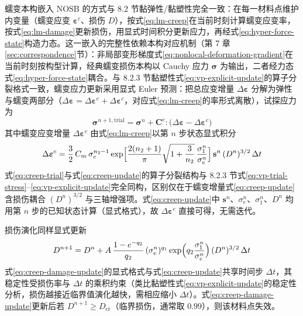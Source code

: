 蠕变本构嵌入 NOSB 的方式与 8.2 节黏弹性/黏塑性完全一致：在每一材料点维护内变量（蠕变应变 $\boldsymbol{\varepsilon}^{c}$、损伤 $D$），按式\eqref{eq:lm-creep}在当前时刻计算蠕变应变率，按式\eqref{eq:lm-damage}更新损伤，用显式时间积分更新应力，再经式\eqref{eq:hyper-force-state}构造力态。这一嵌入的完整性依赖本构对应机制（第 7 章\ref{sec:correspondence}节）：非局部变形梯度式\eqref{eq:nonlocal-deformation-gradient}在当前时刻按构型计算，经典蠕变损伤本构以 Cauchy 应力 $\boldsymbol{\sigma}$ 为输出，二者经力态式\eqref{eq:hyper-force-state}耦合。与 8.2.3 节黏塑性式\eqref{eq:vp-explicit-update}的算子分裂格式一致，蠕变应力更新采用显式 Euler 预测：把总应变增量 $\Delta\boldsymbol{\varepsilon}$ 分解为弹性与蠕变两部分（$\Delta\boldsymbol{\varepsilon}=\Delta\boldsymbol{\varepsilon}^{e}+\Delta\boldsymbol{\varepsilon}^{c}$，对应式\eqref{eq:lm-creep}的率形式离散），试探应力为
\begin{equation}
  \boldsymbol{\sigma}^{n+1,\mathrm{trial}}
  =\boldsymbol{\sigma}^{n}+\mathbf{C}^{e}:\bigl(\Delta\boldsymbol{\varepsilon}-\Delta\boldsymbol{\varepsilon}^{c}\bigr)
  \label{eq:creep-trial}
\end{equation}
其中蠕变应变增量 $\Delta\boldsymbol{\varepsilon}^{c}$ 由式\eqref{eq:lm-creep}以第 $n$ 步状态显式积分
\begin{equation}
  \Delta\boldsymbol{\varepsilon}^{c}
  =\frac{3}{2}\,C_{m}\,\sigma_{e}^{n_{2}-1}
  \exp\Bigl[\frac{2(n_{2}+1)}{\pi}\sqrt{1+\frac{3}{n_{2}}}\,\frac{\sigma_{1}^{n}}{\sigma_{e}^{n}}\Bigr]
  \,\mathbf{s}^{n}\,(D^{n})^{3/2}\,\Delta t
  \label{eq:creep-update}
\end{equation}
式\eqref{eq:creep-trial}与式\eqref{eq:creep-update}的算子分裂结构与 8.2.3 节式\eqref{eq:vp-trial-stress}--\eqref{eq:vp-explicit-update}完全同构，区别仅在于蠕变增量式\eqref{eq:creep-update}含损伤耦合 $(D^{n})^{3/2}$ 与三轴增强项。式\eqref{eq:creep-update}中 $\mathbf{s}^{n}$、$\sigma_{e}^{n}$、$\sigma_{1}^{n}$、$D^{n}$ 均用第 $n$ 步的已知状态计算（显式格式），故 $\Delta\boldsymbol{\varepsilon}^{c}$ 直接可得，无需迭代。

损伤演化同样显式更新
\begin{equation}
  D^{n+1}=D^{n}+A\,\frac{1-e^{-q_{2}}}{q_{2}}\,(\sigma_{e}^{n})^{q_{1}}
  \exp\Bigl(q_{2}\frac{\sigma_{1}^{n}}{\sigma_{e}^{n}}\Bigr)\,(D^{n})^{3/2}\,\Delta t
  \label{eq:creep-damage-update}
\end{equation}
式\eqref{eq:creep-damage-update}的显式格式与式\eqref{eq:creep-update}共享时间步 $\Delta t$，其稳定性受损伤率与 $\Delta t$ 的乘积约束（类比黏塑性式\eqref{eq:vp-explicit-update}的稳定性分析，损伤越接近临界值演化越快，需相应缩小 $\Delta t$）。式\eqref{eq:creep-damage-update}更新后若 $D^{n+1}\ge D_{\mathrm{cr}}$（临界损伤，通常取 $0.99$），则该材料点失效。

